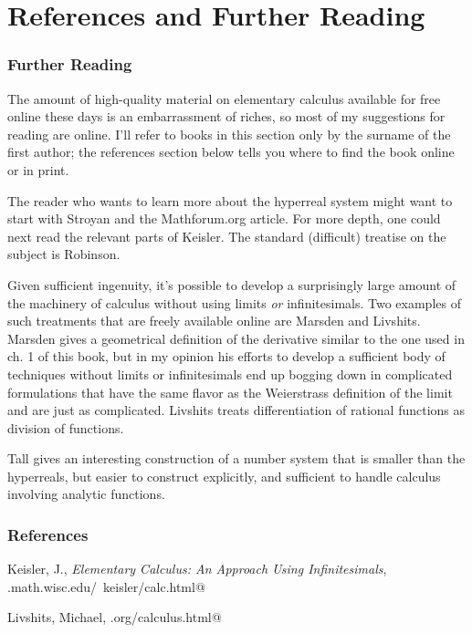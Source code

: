 \chapter{References and Further Reading}\label{ch:further-reading}

\subsection{Further Reading}

The amount of high-quality material on elementary calculus available for free online
these days is an embarrassment of riches, so most of my suggestions for reading are
online. I'll refer to books in this section only by the surname of the first author;
the references section below tells you where to find the book online or in print.

The reader who
wants to learn more about the hyperreal system might want to start
with Stroyan and the Mathforum.org article.
For more depth, one could next read the relevant parts of Keisler.
The standard (difficult) treatise on the subject is Robinson.

Given sufficient ingenuity, it's possible to develop a surprisingly large amount of
the machinery of calculus without using limits \emph{or} infinitesimals.
Two examples of such treatments that are freely available online are
Marsden and Livshits. Marsden gives a geometrical definition
of the derivative similar to the one used in ch. 1 of this book, but in my opinion
his efforts to develop a sufficient body of techniques without limits or infinitesimals
end up bogging down in complicated formulations that have the same flavor as the
Weierstrass definition of the limit and are just as complicated. Livshits
treats differentiation of rational functions as division of functions.

Tall gives an interesting construction of a number system that is smaller than the hyperreals,
but easier to construct explicitly, and sufficient to handle calculus involving analytic functions.

\subsection{References}\label{references}

Keisler, J., \emph{Elementary Calculus: An Approach Using Infinitesimals}, \verb@www.math.wisc.edu/~keisler/calc.html@

Livshits, Michael, \verb@mathfoolery.org/calculus.html@

